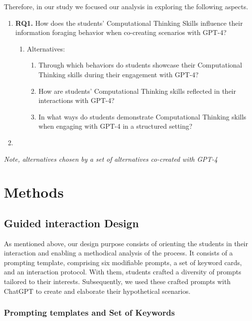 \documentclass[sn-mathphys, Numbered]{sn-jnl}%
\theoremstyle{thmstyleone}%
\theoremstyle{thmstyletwo}%
\theoremstyle{thmstylethree}%
\begin{document}
Therefore, in our study we focused our analysis in exploring the following aspects.
\begin{enumerate}
    \item[] \textbf{RQ1.} How does the students' Computational Thinking Skills influence their information foraging behavior when co-creating scenarios with GPT-4?
    \begin{enumerate}
        \item[] Alternatives:
        \begin{enumerate}
            \item  Through which behaviors do students showcase their Computational Thinking skills during their engagement with GPT-4?
            \item How are students' Computational Thinking skills reflected in their interactions with GPT-4? 
            \item In what ways do students demonstrate Computational Thinking skills when engaging with GPT-4 in a structured setting?
        \end{enumerate}
    \end{enumerate}
    \item  [] %
\end{enumerate}
\textit{Note, alternatives chosen by a set of alternatives co-created with GPT-4 }


\section{Methods}\label{Methods}

\subsection*{Guided interaction Design}\label{Interaction design}

As mentioned above,  our design purpose consists of orienting the students in their interaction and enabling a methodical analysis of the process. It consists of a prompting template, comprising six modifiable prompts, a set of keyword cards, and an interaction protocol. With them, students crafted a diversity of prompts tailored to their interests. Subsequently, we used these crafted prompts with ChatGPT to create and elaborate their hypothetical scenarios. 

\subsubsection*{Prompting templates and Set of Keywords}
\end{document}
